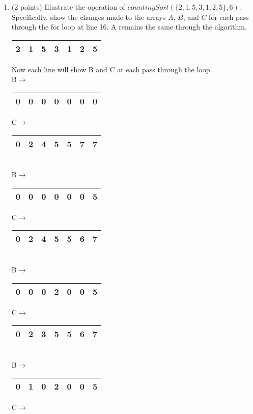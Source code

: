 \documentclass[12pt]{elsart}
\begin{document}
\begin{enumerate}
   \item (2 points) Illustrate the operation of $countingSort(\{2,1,5,3,1,2,5\},6)$.  Specifically, show the changes made to the arrays $A$, $B$, and $C$ for each pass through the for loop at line 16.
\newpage
   A remains the same through the algorithm.
   \begin{tabular}{|l|l|l|l|l|l|l|}
   	\hline
   	2 & 1 & 5 & 3 & 1 & 2 & 5\\
   	\hline
   \end{tabular}
   Now each line will show B and C at each pass through the loop.\\
   B$\rightarrow$\begin{tabular}{|l|l|l|l|l|l|l|}
   	\hline
   	0 & 0 & 0 & 0 & 0 & 0 & 0\\
   	\hline
   \end{tabular}
   C$\rightarrow$\begin{tabular}{|l|l|l|l|l|l|l|}
   	\hline
   	0 & 2 & 4 & 5 & 5 & 7 & 7\\
   	\hline
   \end{tabular}\\
   B$\rightarrow$\begin{tabular}{|l|l|l|l|l|l|l|}
   	\hline
   	0 & 0 & 0 & 0 & 0 & 0 & 5\\
   	\hline
   \end{tabular}
   C$\rightarrow$\begin{tabular}{|l|l|l|l|l|l|l|}
   	\hline
   	0 & 2 & 4 & 5 & 5 & 6 & 7\\
   	\hline
   \end{tabular}\\
   B$\rightarrow$\begin{tabular}{|l|l|l|l|l|l|l|}
   	\hline
   	0 & 0 & 0 & 2 & 0 & 0 & 5\\
   	\hline
   \end{tabular}
   C$\rightarrow$\begin{tabular}{|l|l|l|l|l|l|l|}
   	\hline
   	0 & 2 & 3 & 5 & 5 & 6 & 7\\
   	\hline
   \end{tabular}\\
   B$\rightarrow$\begin{tabular}{|l|l|l|l|l|l|l|}
   	\hline
   	0 & 1 & 0 & 2 & 0 & 0 & 5\\
   	\hline
   \end{tabular}
   C$\rightarrow$\begin{tabular}{|l|l|l|l|l|l|l|}
   	\hline

\end{tabular}
\end{enumerate}
\end{document}
